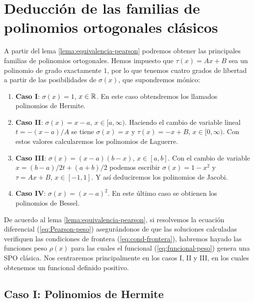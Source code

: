 
\section{Deducción de las familias de polinomios ortogonales clásicos}
\label{section:deduccion-clasicos}

A partir del lema \ref{lema:equivalencia-pearson} podremos obtener las principales familias de polinomios ortogonales. Hemos impuesto que $\tau(x)=Ax+B$ sea un polinomio de grado exactamente $1$, por lo que tenemos cuatro grados de libertad a partir de las posibilidades de $\sigma(x)$, que supondremos mónico:

\begin{enumerate}
    \item \textbf{Caso I}: $\sigma(x) = 1$, $x\in\mathbb{R}$. En este caso obtendremos los llamados polinomios de Hermite.
    \item \textbf{Caso II}: $\sigma(x) = x-a$, $x\in[a,\infty)$. Haciendo el cambio de variable lineal $t=-(x-a)/A$ se tiene $\sigma(x) = x$ y $\tau(x)=-x+B$, $x\in[0,\infty)$. Con estos valores calcularemos los polinomios de Laguerre.
    \item \textbf{Caso III}: $\sigma(x) = (x-a)(b-x)$, $x\in[a,b]$. Con el cambio de variable $x = (b-a)/2t + (a+b)/2$ podemos escribir $\sigma(x)=1-x^2$ y $\tau=Ax+B$, $x\in[-1,1]$. Y así deduciremos los polinomios de Jacobi.
    \item \textbf{Caso IV}: $\sigma(x) = (x-a)^2$. En este último caso se obtienen los polinomios de Bessel. 
\end{enumerate}


De acuerdo al lema \ref{lema:equivalencia-pearson}, si resolvemos la ecuación diferencial (\ref{eq:Pearson-peso}) asegurándonos de que las soluciones calculadas verifiquen las condiciones de frontera (\ref{eq:cond-frontera}), habremos hayado las funciones peso $\rho(x)$ para las cuales el funcional (\ref{eq:funcional-peso}) genera una SPO clásica. Nos centraremos principalmente en los casos I, II y III, en los cuales obtenemos un funcional definido positivo.

\subsection{Caso I: Polinomios de Hermite}
\label{subsection:Hermite}

